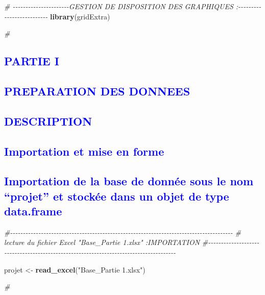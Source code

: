 \documentclass[
]{article}
\newenvironment{Shaded}{\begin{snugshade}}{\end{snugshade}}
\newcommand{\CommentTok}[1]{\textcolor[rgb]{0.56,0.35,0.01}{\textit{#1}}}
\newcommand{\FunctionTok}[1]{\textcolor[rgb]{0.13,0.29,0.53}{\textbf{#1}}}
\newcommand{\NormalTok}[1]{#1}
\newcommand{\OtherTok}[1]{\textcolor[rgb]{0.56,0.35,0.01}{#1}}
\newcommand{\StringTok}[1]{\textcolor[rgb]{0.31,0.60,0.02}{#1}}
\begin{document}
\begin{Shaded}
\begin{Highlighting}[]
\CommentTok{\# {-}{-}{-}{-}{-}{-}{-}{-}{-}{-}{-}{-}{-}{-}{-}{-}{-}{-}{-}{-}{-}{-}GESTION DE DISPOSITION DES GRAPHIQUES :{-}{-}{-}{-}{-}{-}{-}{-}{-}{-}{-}{-}{-}{-}{-}{-}{-}{-}{-}{-}{-}{-}{-}{-}{-}{-}}
\FunctionTok{library}\NormalTok{(gridExtra)}


\CommentTok{\#}
\end{Highlighting}
\end{Shaded}

\newpage

\textcolor{blue}{\section*{PARTIE I}}

\textcolor{blue}{\section*{PREPARATION DES DONNEES}}

\textcolor{blue}{\section{DESCRIPTION}}

\textcolor{blue}{\subsection{Importation et mise en forme}}

\textcolor{blue}{\subsection{Importation de la base de donnée sous le nom “projet” et stockée dans un objet de type data.frame}}

\begin{Shaded}
\begin{Highlighting}[]
\CommentTok{\#{-}{-}{-}{-}{-}{-}{-}{-}{-}{-}{-}{-}{-}{-}{-}{-}{-}{-}{-}{-}{-}{-}{-}{-}{-}{-}{-}{-}{-}{-}{-}{-}{-}{-}{-}{-}{-}{-}{-}{-}{-}{-}{-}{-}{-}{-}{-}{-}{-}{-}{-}{-}{-}{-}{-}{-}{-}{-}{-}{-}{-}{-}{-}{-}{-}{-}{-}{-}{-}{-}{-}{-}{-}{-}{-}{-}{-}{-}{-}{-}{-}{-}{-}{-}{-}{-}{-}}
\CommentTok{\# lecture du fichier Excel "Base\_Partie 1.xlsx" :IMPORTATION  }
\CommentTok{\#{-}{-}{-}{-}{-}{-}{-}{-}{-}{-}{-}{-}{-}{-}{-}{-}{-}{-}{-}{-}{-}{-}{-}{-}{-}{-}{-}{-}{-}{-}{-}{-}{-}{-}{-}{-}{-}{-}{-}{-}{-}{-}{-}{-}{-}{-}{-}{-}{-}{-}{-}{-}{-}{-}{-}{-}{-}{-}{-}{-}{-}{-}{-}{-}{-}{-}{-}{-}{-}{-}{-}{-}{-}{-}{-}{-}{-}{-}{-}{-}{-}{-}{-}{-}{-}{-}{-}}

\NormalTok{projet }\OtherTok{\textless{}{-}} \FunctionTok{read\_excel}\NormalTok{(}\StringTok{"Base\_Partie 1.xlsx"}\NormalTok{)}

\CommentTok{\#}
\end{Highlighting}
\end{Shaded}
\end{document}
